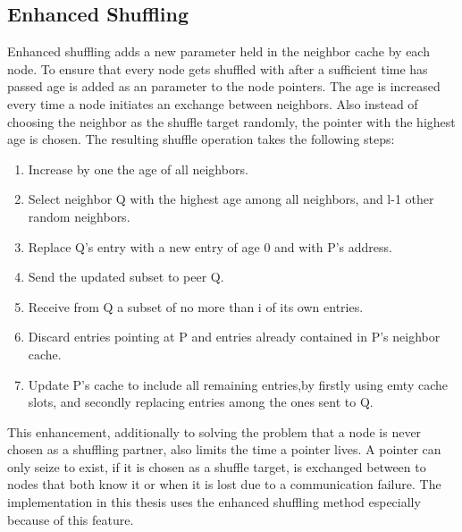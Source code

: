 \subsection{Enhanced Shuffling}
Enhanced shuffling adds a new parameter held in the neighbor cache by each node.
To ensure that every node gets shuffled with after a sufficient time has passed
age is added as an parameter to the node pointers. The age is increased every
time a node initiates an exchange between neighbors. Also instead of choosing
the neighbor as the shuffle target randomly, the pointer with the highest
age is chosen. The resulting shuffle operation takes the following steps:

\begin{enumerate}
\item Increase by one the age of all neighbors.
\item Select neighbor Q with the highest age among all neighbors, and l-1 other
random neighbors.
\item Replace Q's entry with a new entry of age 0 and with P's address.
\item Send the updated subset to peer Q.
\item Receive from Q a subset of no more than i of its own entries.
\item Discard entries pointing at P and entries already contained in P's
neighbor cache.
\item Update P's cache to include all remaining entries,by firstly using emty
cache slots, and secondly replacing entries among the ones sent to Q.
\end{enumerate}

This enhancement, additionally to solving the problem that a node is never
chosen as a shuffling partner, also limits the time a pointer lives. A pointer
can only seize to exist, if it is chosen as a shuffle target, is exchanged
between to nodes that both know it or when it is lost due to a communication
failure. The implementation in this thesis uses the enhanced shuffling method
especially because of this feature.

